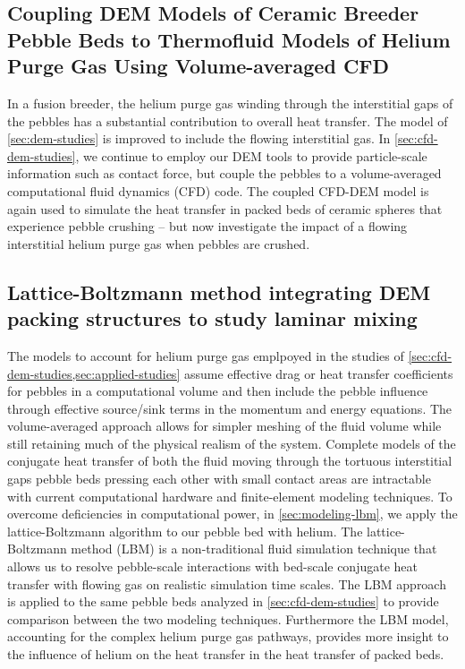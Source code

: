 \subsection*{Coupling DEM Models of Ceramic Breeder Pebble Beds to Thermofluid Models of Helium Purge Gas Using Volume-averaged CFD}
In a fusion breeder, the helium purge gas winding through the interstitial gaps of the pebbles has a substantial contribution to overall heat transfer.\cite{Reimann:2002mi,Abou-Sena2005} The model of \cref{sec:dem-studies} is improved to include the flowing interstitial gas. In \cref{sec:cfd-dem-studies}, we continue to employ our DEM tools to provide particle-scale information such as contact force, but couple the pebbles to a volume-averaged computational fluid dynamics (CFD) code. The coupled CFD-DEM model is again used to simulate the heat transfer in packed beds of ceramic spheres that experience pebble crushing -- but now investigate the impact of a flowing interstitial helium purge gas when pebbles are crushed.


\subsection*{Lattice-Boltzmann method integrating DEM packing structures to study laminar mixing}
The models to account for helium purge gas emplpoyed in the studies of \cref{sec:cfd-dem-studies,sec:applied-studies} assume effective drag or heat transfer coefficients for pebbles in a computational volume and then include the pebble influence through effective source/sink terms in the momentum and energy equations. The volume-averaged approach allows for simpler meshing of the fluid volume while still retaining much of the physical realism of the system. Complete models of the conjugate heat transfer of both the fluid moving through the tortuous interstitial gaps pebble beds pressing each other with small contact areas are intractable with current computational hardware and finite-element modeling techniques. To overcome deficiencies in computational power, in \cref{sec:modeling-lbm}, we apply the lattice-Boltzmann algorithm to our pebble bed with helium. The lattice-Boltzmann method (LBM) is a non-traditional fluid simulation technique that allows us to resolve pebble-scale interactions with bed-scale conjugate heat transfer with flowing gas on realistic simulation time scales. The LBM approach is applied to the same pebble beds analyzed in \cref{sec:cfd-dem-studies} to provide comparison between the two modeling techniques. Furthermore the LBM model, accounting for the complex helium purge gas pathways, provides more insight to the influence of helium on the heat transfer in the heat transfer of packed beds.



